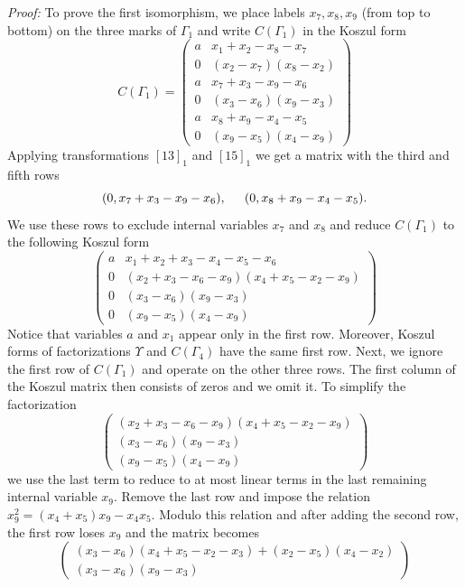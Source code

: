 \documentclass[12pt]{article}
\begin{document}
\emph{Proof:} To prove the first isomorphism, we place labels $x_7, x_8, x_9$ 
(from top to bottom) on the three marks of $\Gamma_1$ and write 
$C(\Gamma_1)$ in the Koszul form 
$$ C(\Gamma_1) = \left( \begin{array}{cc} 
    a & x_ 1+ x_2 - x_8  - x_7 \\ 
    0 & (x_2-x_7)(x_8-x_2)  \\
    a & x_7 + x_3 - x_9 - x_6 \\
    0 & (x_3-x_6)(x_9-x_3) \\
    a & x_8 + x_9 -x_4 -x_5 \\
    0 & (x_9-x_5)(x_4 - x_9) \end{array} \right) $$ 
Applying transformations $[13]_1$ and $[15]_1$ we get a matrix 
with the third and fifth rows 
$$ (0, x_7 + x_3 -x_9 -x_6), \hspace{0.2in} (0, x_8+x_9 -x_4 -x_5).$$ 
We use these rows to exclude internal variables $x_7$ and $x_8$ and 
reduce $C(\Gamma_1)$ to the following Koszul form 
$$ \left( \begin{array}{cc} 
    a & x_ 1+ x_2 +x_3 - x_4  - x_5 -x_6 \\ 
    0 & (x_2+x_3-x_6-x_9)(x_4+x_5-x_2-x_9)  \\
    0 & (x_3-x_6)(x_9-x_3) \\
    0 & (x_9-x_5)(x_4 - x_9) \end{array} \right) $$ 
Notice that variables $a$ and $x_1$ appear only in the first row. 
Moreover, Koszul forms of factorizations $\Upsilon$ and 
$C(\Gamma_4)$ have the same first row. Next, we ignore 
the first row of $C(\Gamma_1)$ and operate on the other three 
rows. The first column of the Koszul matrix then consists of zeros 
and we omit it. To simplify the factorization
$$ \left( \begin{array}{c}
    (x_2+x_3-x_6-x_9)(x_4+x_5-x_2-x_9)  \\
    (x_3-x_6)(x_9-x_3) \\
    (x_9-x_5)(x_4 - x_9) \end{array} \right) $$ 
we use the last term to reduce to at most linear terms in the 
last remaining internal variable $x_9.$ Remove the last row 
and impose the relation $x_9^2=(x_4+x_5)x_9 -x_4 x_5.$ 
Modulo this relation and after adding the second row, the 
first row loses $x_9$ and the matrix becomes
$$\left( \begin{array}{c} 
  (x_3-x_6)(x_4+x_5-x_2-x_3)+(x_2-x_5)(x_4-x_2) \\
    (x_3-x_6)(x_9-x_3) \end{array}\right) $$ 
\end{document}
